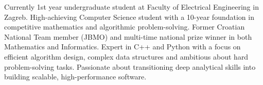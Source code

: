 

\begin{cvparagraph}

Currently 1st year undergraduate student at Faculty of Electrical Engineering in Zagreb. High-achieving Computer Science student with a 10-year foundation in competitive mathematics and algorithmic problem-solving. Former Croatian National Team member (JBMO) and multi-time national prize winner in both Mathematics and Informatics. Expert in C++ and Python with a focus on efficient algorithm design, complex data structures and ambitious about hard problem-solving tasks. Passionate about transitioning deep analytical skills into building scalable, high-performance software.

\end{cvparagraph}
